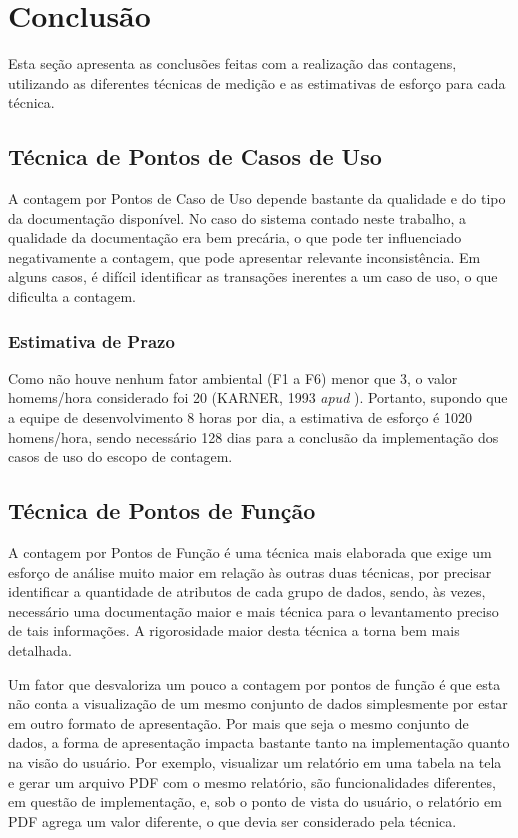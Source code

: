 \chapter{Conclusão}

  Esta seção apresenta as conclusões feitas com a realização das contagens, utilizando as diferentes técnicas de medição e as estimativas de esforço
  para cada técnica.
  
  

  \section{Técnica de Pontos de Casos de Uso}
      
    A contagem por Pontos de Caso de Uso depende bastante da qualidade e do tipo da documentação disponível.
    No caso do sistema contado neste trabalho, a qualidade da documentação era bem precária, o que pode 
    ter influenciado negativamente a contagem, que pode apresentar relevante inconsistência. Em alguns casos, é difícil 
    identificar as transações inerentes a um caso de uso, o que dificulta a contagem.
    
    \subsection{Estimativa de Prazo}
   
      Como não houve nenhum fator ambiental (F1 a F6) menor que 3, o valor homems/hora considerado foi 20 (KARNER, 1993 \textit{apud} \cite{artigo_pcu}). Portanto, supondo que a equipe de desenvolvimento
      8 horas por dia, a estimativa de esforço é 1020 homens/hora, sendo necessário 128 dias para a conclusão da implementação dos casos de uso
      do escopo de contagem.
	
  \section{Técnica de Pontos de Função}
    
    A contagem por Pontos de Função é uma técnica mais elaborada que exige um esforço de análise muito maior em relação às outras duas 
    técnicas, por precisar identificar a quantidade de atributos de cada grupo de dados, sendo, às vezes, necessário uma documentação maior e mais técnica
    para o levantamento preciso de tais informações. A rigorosidade maior desta técnica a torna bem mais detalhada.
    
    Um fator que desvaloriza um pouco a contagem por pontos de função é que esta não conta a visualização de um mesmo 
    conjunto de dados simplesmente por estar em outro formato de apresentação. Por mais que seja o mesmo conjunto de dados, 
    a forma de apresentação impacta bastante tanto na implementação quanto na visão do usuário. Por exemplo, visualizar um relatório 
    em uma tabela na tela e gerar um arquivo PDF com o mesmo relatório, são funcionalidades diferentes, em questão de implementação, 
    e, sob o ponto de vista do usuário, o relatório em PDF agrega um valor diferente, o que devia ser considerado pela técnica.
    
